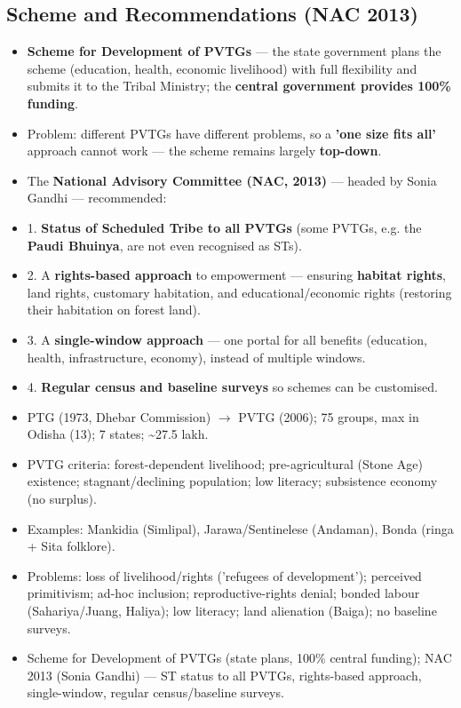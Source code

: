 \subsection{Scheme and Recommendations (NAC 2013)}

\begin{GovtPolicy}
\begin{itemize}
\item \textbf{Scheme for Development of PVTGs} --- the state government plans the scheme (education, health, economic livelihood) with full flexibility and submits it to the Tribal Ministry; the \textbf{central government provides 100\% funding}.
\item Problem: different PVTGs have different problems, so a \textbf{'one size fits all'} approach cannot work --- the scheme remains largely \textbf{top-down}.
\item The \textbf{National Advisory Committee (NAC, 2013)} --- headed by Sonia Gandhi --- recommended:
\item 1. \textbf{Status of Scheduled Tribe to all PVTGs} (some PVTGs, e.g. the \textbf{Paudi Bhuinya}, are not even recognised as STs).
\item 2. A \textbf{rights-based approach} to empowerment --- ensuring \textbf{habitat rights}, land rights, customary habitation, and educational/economic rights (restoring their habitation on forest land).
\item 3. A \textbf{single-window approach} --- one portal for all benefits (education, health, infrastructure, economy), instead of multiple windows.
\item 4. \textbf{Regular census and baseline surveys} so schemes can be customised.
\end{itemize}
\end{GovtPolicy}

\begin{QuickRevision}
\begin{itemize}
\item PTG (1973, Dhebar Commission) $\rightarrow$ PVTG (2006); 75 groups, max in Odisha (13); 7 states; \textasciitilde{}27.5 lakh.
\item PVTG criteria: forest-dependent livelihood; pre-agricultural (Stone Age) existence; stagnant/declining population; low literacy; subsistence economy (no surplus).
\item Examples: Mankidia (Simlipal), Jarawa/Sentinelese (Andaman), Bonda (ringa + Sita folklore).
\item Problems: loss of livelihood/rights ('refugees of development'); perceived primitivism; ad-hoc inclusion; reproductive-rights denial; bonded labour (Sahariya/Juang, Haliya); low literacy; land alienation (Baiga); no baseline surveys.
\item Scheme for Development of PVTGs (state plans, 100\% central funding); NAC 2013 (Sonia Gandhi) --- ST status to all PVTGs, rights-based approach, single-window, regular census/baseline surveys.
\end{itemize}
\end{QuickRevision}

